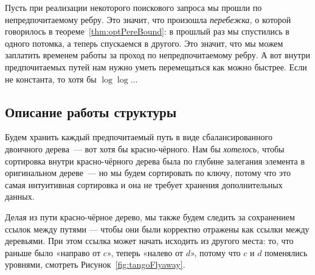 Пусть при реализации некоторого поискового запроса мы прошли по непредпочитаемому ребру. Это значит, что произошла {\it перебежка,} о которой говорилось в теореме~\ref{thm:optPereBound}: в прошлый раз мы спустились в одного потомка, а теперь спускаемся в другого. Это значит, что мы можем заплатить временем работы за проход по непредпочитаемому ребру. А вот внутри предпочитаемых путей нам нужно уметь перемещаться как можно быстрее. Если не константа, то хотя бы $\log \log$...

\subsection{Описание работы структуры}

Будем хранить каждый предпочитаемый путь в виде сбалансированного двоичного дерева~— вот хотя бы красно-чёрного. Нам бы {\it хотелось,} чтобы сортировка внутри красно-чёрного дерева была по глубине залегания элемента в оригинальном дереве~— но мы будем сортировать по ключу, потому что это самая интуитивная сортировка и она не требует хранения дополнительных данных.

Делая из пути красно-чёрное дерево, мы также будем следить за сохранением ссылок между путями — чтобы они были корректно отражены как ссылки между деревьями. При этом ссылка может начать исходить из другого места: то, что раньше было «направо от $c$», теперь «налево от $d$», потому что $c$ и $d$ поменялись уровнями, смотреть Рисунок~\ref{fig:tangoFlyaway}. 